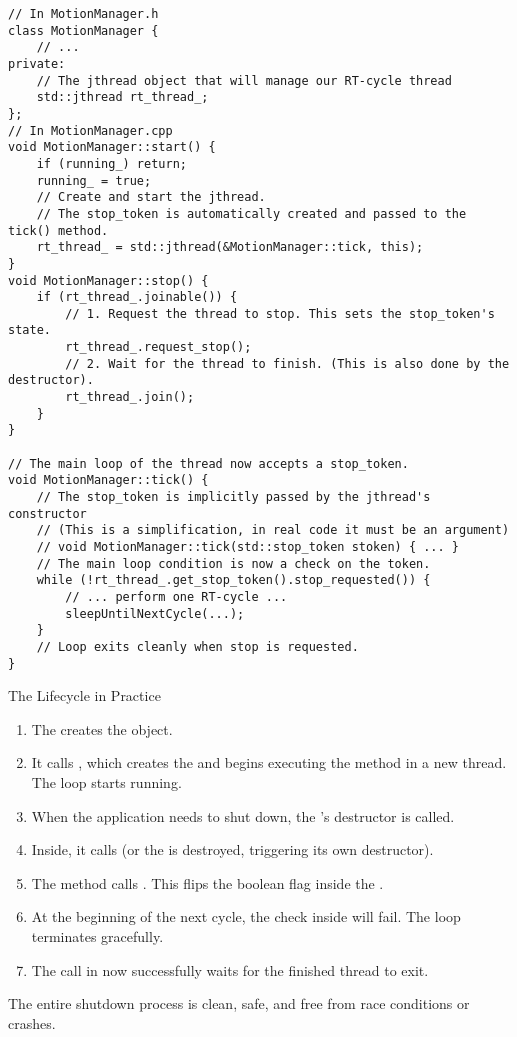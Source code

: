 \begin{verbatim}
// In MotionManager.h
class MotionManager {
    // ...
private:
    // The jthread object that will manage our RT-cycle thread
    std::jthread rt_thread_;
};
// In MotionManager.cpp
void MotionManager::start() {
    if (running_) return;
    running_ = true;
    // Create and start the jthread.
    // The stop_token is automatically created and passed to the tick() method.
    rt_thread_ = std::jthread(&MotionManager::tick, this);
}
void MotionManager::stop() {
    if (rt_thread_.joinable()) {
        // 1. Request the thread to stop. This sets the stop_token's state.
        rt_thread_.request_stop();
        // 2. Wait for the thread to finish. (This is also done by the destructor).
        rt_thread_.join();
    }
}

// The main loop of the thread now accepts a stop_token.
void MotionManager::tick() {
    // The stop_token is implicitly passed by the jthread's constructor
    // (This is a simplification, in real code it must be an argument)
    // void MotionManager::tick(std::stop_token stoken) { ... }
    // The main loop condition is now a check on the token.
    while (!rt_thread_.get_stop_token().stop_requested()) {
        // ... perform one RT-cycle ...
        sleepUntilNextCycle(...);
    }
    // Loop exits cleanly when stop is requested.
}
\end{verbatim}
\label{lst:jthread-in-motionmanager}

\begin{tipbox}{The Lifecycle in Practice}
\begin{enumerate}
    \item The  creates the  object.
    \item It calls , which creates the  and begins executing the  method in a new thread. The  loop starts running.
    \item When the application needs to shut down, the 's destructor is called.
    \item Inside, it calls  (or the  is destroyed, triggering its own destructor).
    \item The  method calls . This flips the boolean flag inside the .
    \item At the beginning of the next cycle, the  check inside  will fail. The loop terminates gracefully.
    \item The  call in  now successfully waits for the finished thread to exit.
\end{enumerate}
The entire shutdown process is clean, safe, and free from race conditions or crashes.
\end{tipbox}

